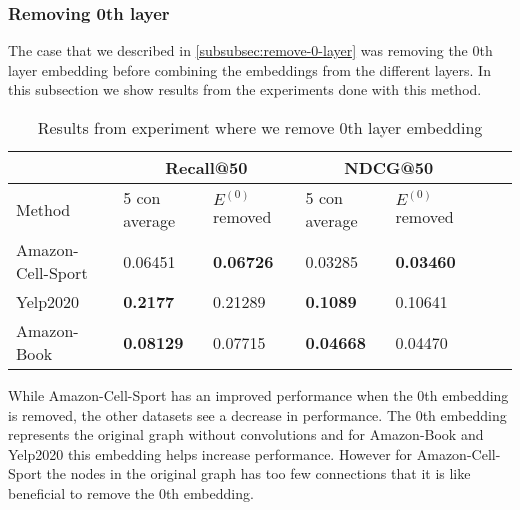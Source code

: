 \subsubsection{Removing 0th layer}
The case that we described in \autoref{subsubsec:remove-0-layer} was removing the 0th layer embedding before combining the embeddings from the different layers.
In this subsection we show results from the experiments done with this method.
\begin{table*}[h!]
    \centering
    \begin{tabular}{|l|l|l||l|l||l|l|}
        \hline
                          & \multicolumn{2}{c||}{Recall@50} & \multicolumn{2}{c||}{NDCG@50}                                        \\ \hline
        Method            & 5 con average                   & $E^{(0)}$ removed             & 5 con average    & $E^{(0)}$ removed \\ \hline
        Amazon-Cell-Sport & 0.06451                         & \textbf{0.06726}              & 0.03285          & \textbf{0.03460}  \\ \hline
        Yelp2020          & \textbf{0.2177}                 & 0.21289                       & \textbf{0.1089}  & 0.10641           \\ \hline
        Amazon-Book       & \textbf{0.08129}                & 0.07715                       & \textbf{0.04668} & 0.04470           \\ \hline
    \end{tabular}
    \label{tab:removing-0th-layer-embedding-experiment}
    \caption{Results from experiment where we remove 0th layer embedding}
\end{table*}
While Amazon-Cell-Sport has an improved performance when the 0th embedding is removed, the other datasets see a decrease in performance.
The 0th embedding represents the original graph without convolutions and for Amazon-Book and Yelp2020 this embedding helps increase performance.
However for Amazon-Cell-Sport the nodes in the original graph has too few connections that it is like beneficial to remove the 0th embedding.
